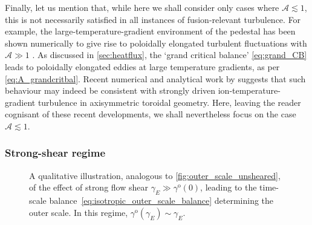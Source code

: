 \documentclass{jpp}
\newcommand{\gammao}{\gamma^\text{o}}
\newcommand{\gammaoO}{\gamma^\text{o}(0)}
\newcommand{\gammaE}{\gamma_{E}}
\newcommand{\A}{\mathcal{A}}
\begin{document}
Finally, let us mention that, while here we shall consider only cases where \mbox{\(\A \lesssim 1\)}, this is not necessarily satisfied in all instances of fusion-relevant turbulence. For example, the large-temperature-gradient environment of the pedestal has been shown numerically to give rise to poloidally elongated turbulent fluctuations with \(\A \gg 1\) \citep{parisi20, parisi22}. As discussed in \cref{sec:heatflux}, the `grand critical balance' \cref{eq:grand_CB} leads to poloidally elongated eddies at large temperature gradients, as per \cref{eq:A_grandcritbal}. Recent numerical and analytical work by \mbox{\citet{nies24}} suggests that such behaviour may indeed be consistent with strongly driven ion-temperature-gradient turbulence in axisymmetric toroidal geometry. Here, leaving the reader cognisant of these recent developments, we shall nevertheless focus on the case~\(\A \lesssim 1\).
 
\subsubsection{Strong-shear regime}
\label{sec:strong_shear}

\begin{figure}
	\centering
	\scalebox{1.0}{}
	\caption{A qualitative illustration, analogous to \cref{fig:outer_scale_unsheared}, of the effect of strong flow shear \(\gammaE \gg \gammaoO\), leading to the time-scale balance~\cref{eq:isotropic_outer_scale_balance} determining the outer scale. In this regime, \(\gammao(\gammaE) \sim \gammaE\).}
	\label{fig:outer_scale_sheared}
\end{figure}
\end{document}
